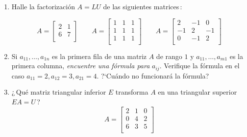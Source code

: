 \documentclass[12pt,a4paper]{article}
\newcommand\1{\mbox{\,\vrule height-0.8pt depth1.0pt width2pc\,}}
\newcommand\2{\mbox{\,\vrule height-0.8pt depth1.0pt width1pc\,}}
\begin{document}
\begin{enumerate}
    
\item Halle la factorización $A=LU$ de las siguientes matrices\,:

\vspace{-7pt}
$$
A=\left[\begin{array}{rr}2&1\\6&7\\\end{array}\right]\qquad A=\left[\begin{array}{rrr}1&1&1\\1&1&1\\1&1&1\\\end{array}\right]\qquad A=\left[\begin{array}{rrr}2&-1&0\\-1&2&-1\\0&-1&2\\\end{array}\right]
$$
\item Si $a_{11},\ldots,a_{1n}$ es la primera fila de una matriz $A$ de rango $1$ y $a_{11},\ldots,a_{m1}$ es la primera columna, \emph{encuentre una fórmula para} $a_{ij}$. Verifique la fórmula en el caso $a_{11}=2, a_{12}=3, a_{21}=4$. ?`Cuándo no funcionará la fórmula?
\item ¿\,Qué matriz triangular inferior $E$ transforma $A$ en una triangular superior $EA=U$\,?
%
$$
A=\left[\begin{array}{rrr}2&1&0\\0&4&2\\6&3&5\\\end{array}\right]
$$


\end{enumerate}
\end{document}
